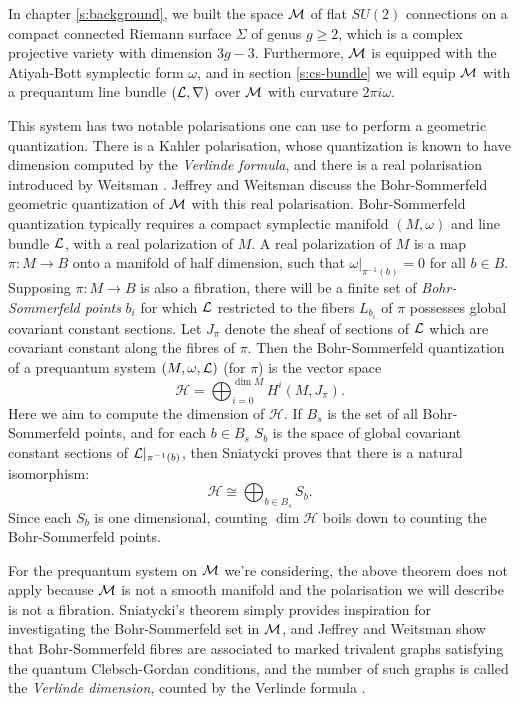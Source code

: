 
	In chapter \ref{s:background}, we built the space $\mathcal{M}$ of flat $SU(2)$ connections on a compact connected Riemann surface $\Sigma$ of genus $g\geq 2$, which is a complex projective variety with dimension $3g-3$. Furthermore, $\mathcal{M}$ is equipped with the Atiyah-Bott symplectic form $\omega$, and in section \ref{s:cs-bundle} we will equip $\mathcal{M}$ with a prequantum line bundle $(\mathcal{L},\nabla)$ over $\mathcal{M}$ with curvature $2\pi i \omega$.
	
	This system has two notable polarisations one can use to perform a geometric quantization. There is a Kahler polarisation, whose quantization is known to have dimension computed by the \emph{Verlinde formula}, and there is a real polarisation introduced by Weitsman \cite{weitsman_real_1992}. Jeffrey and Weitsman discuss the Bohr-Sommerfeld geometric quantization of $\mathcal{M}$ with this real polarisation. Bohr-Sommerfeld quantization typically requires a compact symplectic manifold $(M,\omega)$ and line bundle $\mathcal{L}$, with a real polarization of $M$. A real polarization of $M$ is a map $\pi:M\to B$ onto a manifold of half dimension, such that $\omega|_{\pi^{-1}(b)} =0$ for all $b\in B$. Supposing $\pi:M\to B$ is also a fibration, there will be a finite set of \textit{Bohr-Sommerfeld points} $b_i$ for which $\mathcal{L}$ restricted to the fibers $L_{b_i}$ of $\pi$ possesses global covariant constant sections. Let $J_\pi$ denote the sheaf of sections of $\mathcal{L}$ which are covariant constant along the fibres of $\pi$. Then the Bohr-Sommerfeld quantization of a prequantum system $(M,\omega,\mathcal{L})$ (for $\pi$) is the vector space
	\begin{equation}
		\mathcal{H} = \bigoplus_{i=0}^{\dim M} H^i(M,J_\pi).
	\end{equation}
	Here we aim to compute the dimension of $\mathcal{H}$. If $B_s$ is the set of all Bohr-Sommerfeld points, and for each $b\in B_s$ $S_b$ is the space of global covariant constant sections of $\mathcal{L}|_{\pi^{-1}(b)}$, then Sniatycki \cite{sniatycki_cohomology_1977} proves that there is a natural isomorphism:
	\begin{equation}
		\mathcal{H} \cong \bigoplus_{b\in B_s} S_b.
	\end{equation}
	Since each $S_b$ is one dimensional, counting $\dim \mathcal{H}$ boils down to counting the Bohr-Sommerfeld points. 
	
	For the prequantum system on $\mathcal{M}$ we're considering, the above theorem does not apply because $\mathcal{M}$ is not a smooth manifold and the polarisation we will describe is not a fibration. Sniatycki's theorem simply provides inspiration for investigating the Bohr-Sommerfeld set in $\mathcal{M}$, and Jeffrey and Weitsman show that Bohr-Sommerfeld fibres are associated to marked trivalent graphs satisfying the quantum Clebsch-Gordan conditions, and the number of such graphs is called the \emph{Verlinde dimension}, counted by the Verlinde formula \cite[Thm. 8.1]{jeffrey_bohr-sommerfeld_1992}.
	
